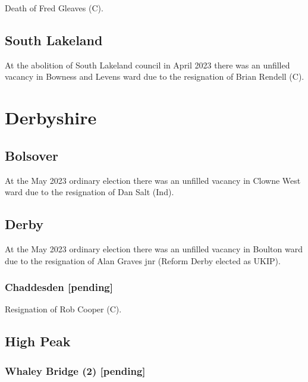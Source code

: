 \documentclass[a4paper,openany]{book}
\begin{document}
\begin{resultsiii}
Death of Fred Gleaves (C).

\subsection*{South Lakeland}

At the abolition of South Lakeland council in April 2023 there was an unfilled vacancy in Bowness and Levens ward due to the resignation of Brian Rendell (C).%

\section{Derbyshire}

\subsection*{Bolsover}

At the May 2023 ordinary election there was an unfilled vacancy in Clowne West ward due to the resignation of Dan Salt (Ind).%

\subsection*{Derby}

At the May 2023 ordinary election there was an unfilled vacancy in Boulton ward due to the resignation of Alan Graves jnr (Reform Derby elected as UKIP).%

\subsubsection*{Chaddesden \hspace*{\fill}\nolinebreak[1]%
	\enspace\hspace*{\fill}
	[pending]}


Resignation of Rob Cooper (C).

\subsection*{High Peak}

\subsubsection*{Whaley Bridge (2) \hspace*{\fill}\nolinebreak[1]%
	\enspace\hspace*{\fill}
	[pending]}


\end{resultsiii}
\end{document}
